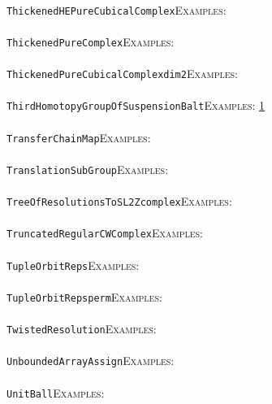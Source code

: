 \documentclass[a4paper,11pt]{report}
\begin{document}
{{ \\
 \texttt{ThickenedHEPureCubicalComplex}{\nobreakspace}{\nobreakspace}{\nobreakspace}{\nobreakspace}\textsc{Examples:} \\
 \\
 \texttt{ThickenedPureComplex}{\nobreakspace}{\nobreakspace}{\nobreakspace}{\nobreakspace}\textsc{Examples:} \\
 \\
 \texttt{ThickenedPureCubicalComplex{\textunderscore}dim2}{\nobreakspace}{\nobreakspace}{\nobreakspace}{\nobreakspace}\textsc{Examples:} \\
 \\
 \texttt{ThirdHomotopyGroupOfSuspensionB{\textunderscore}alt}{\nobreakspace}{\nobreakspace}{\nobreakspace}{\nobreakspace}\textsc{Examples:} \href{../www/SideLinks/About/aboutTensorSquare.html} {1}{\nobreakspace} \\
 \\
 \texttt{TransferChainMap}{\nobreakspace}{\nobreakspace}{\nobreakspace}{\nobreakspace}\textsc{Examples:} \\
 \\
 \texttt{TranslationSubGroup}{\nobreakspace}{\nobreakspace}{\nobreakspace}{\nobreakspace}\textsc{Examples:} \\
 \\
 \texttt{TreeOfResolutionsToSL2Zcomplex}{\nobreakspace}{\nobreakspace}{\nobreakspace}{\nobreakspace}\textsc{Examples:} \\
 \\
 \texttt{TruncatedRegularCWComplex}{\nobreakspace}{\nobreakspace}{\nobreakspace}{\nobreakspace}\textsc{Examples:} \\
 \\
 \texttt{TupleOrbitReps}{\nobreakspace}{\nobreakspace}{\nobreakspace}{\nobreakspace}\textsc{Examples:} \\
 \\
 \texttt{TupleOrbitReps{\textunderscore}perm}{\nobreakspace}{\nobreakspace}{\nobreakspace}{\nobreakspace}\textsc{Examples:} \\
 \\
 \texttt{TwistedResolution}{\nobreakspace}{\nobreakspace}{\nobreakspace}{\nobreakspace}\textsc{Examples:} \\
 \\
 \texttt{UnboundedArrayAssign}{\nobreakspace}{\nobreakspace}{\nobreakspace}{\nobreakspace}\textsc{Examples:} \\
 \\
 \texttt{UnitBall}{\nobreakspace}{\nobreakspace}{\nobreakspace}{\nobreakspace}\textsc{Examples:} \\
}}
\end{document}
